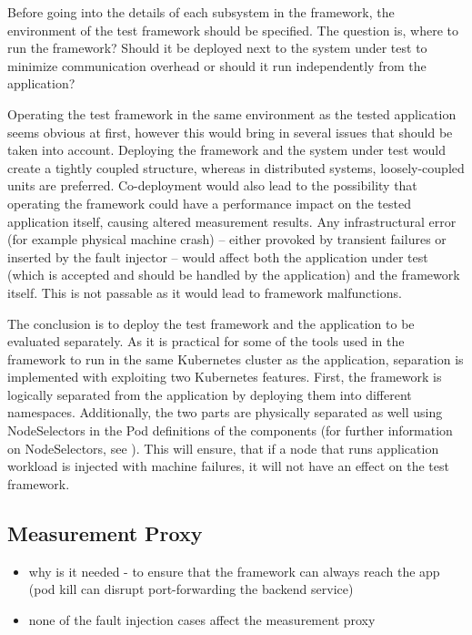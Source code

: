 Before going into the details of each subsystem in the framework, the environment of the test framework should be specified. The question is, where to run the framework? Should it be deployed next to the system under test to minimize communication overhead or should it run independently from the application?

Operating the test framework in the same environment as the tested application seems obvious at first, however this would bring in several issues that should be taken into account. Deploying the framework and the system under test would create a tightly coupled structure, whereas in distributed systems, loosely-coupled units are preferred. Co-deployment would also lead to the possibility that operating the framework could have a performance impact on the tested application itself, causing altered measurement results. Any infrastructural error (for example physical machine crash) -- either provoked by transient failures or inserted by the fault injector -- would affect both the application under test (which is accepted and should be handled by the application) and the framework itself. This is not passable as it would lead to framework malfunctions.

The conclusion is to deploy the test framework and the application to be evaluated separately. As it is practical for some of the tools used in the framework to run in the same Kubernetes cluster as the application, separation is implemented with exploiting two Kubernetes features. First, the framework is logically separated from the application by deploying them into different namespaces. Additionally, the two parts are physically separated as well using NodeSelectors in the Pod definitions of the components (for further information on NodeSelectors, see \cite{KubernetesNodeSelector}). This will ensure, that if a node that runs application workload is injected with machine failures, it will not have an effect on the test framework.

\subsection{Measurement Proxy}

\begin{itemize}
	\item why is it needed - to ensure that the framework can always reach the app (pod kill can disrupt port-forwarding the backend service)
	\item none of the fault injection cases affect the measurement proxy
\end{itemize}

